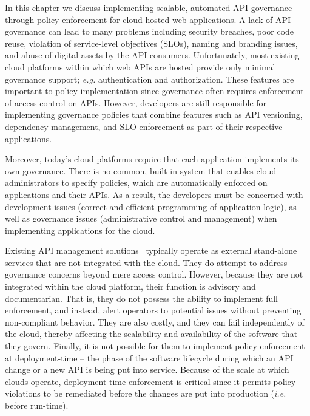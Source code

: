 In this chapter we discuss implementing scalable, automated API governance 
through policy enforcement for cloud-hosted web applications.
A lack of API governance can lead to many problems including security breaches, 
poor code reuse, violation of service-level objectives (SLOs), 
naming and branding issues, and abuse of digital 
assets by the API consumers. Unfortunately, most existing cloud platforms
within which web APIs are hosted provide only minimal governance support; 
{\em e.g.} authentication and authorization.  These features
are important to policy implementation since governance often requires
enforcement of access control on APIs.  
However, developers are still responsible for implementing governance policies
that combine features such as API versioning, 
dependency management, and SLO enforcement as part of their respective
applications.  

Moreover, today's cloud platforms require that each application
implements its own governance. There is no common, built-in system that enables
cloud administrators to specify policies, which are automatically enforced on 
applications and their APIs.
As a result, the developers must be concerned with development issues (correct
and efficient programming of application logic), as well as governance issues 
(administrative control and management) when implementing applications for the cloud.

Existing API management solutions~\cite{3scale,apigee,layer7} typically operate as
external stand-alone services that are not integrated with the cloud. They do attempt to
address governance concerns beyond mere access control. However, because they
are not integrated within the cloud platform, their function is
advisory and documentarian.  That is, they 
do not possess the ability to implement full enforcement, and instead, alert
operators to potential issues without preventing non-compliant behavior.
They are also costly, and they can fail independently of the cloud, thereby affecting 
the scalability and availability of the software that they govern.
Finally, it is not possible for them to
implement policy enforcement at deployment-time -- the phase of the software lifecycle
during which an API change or a new API is being put into service.
Because of the scale at which clouds operate, deployment-time enforcement is
critical since it permits policy violations to be remediated before the
changes are put into production ({\em i.e.} before run-time).

